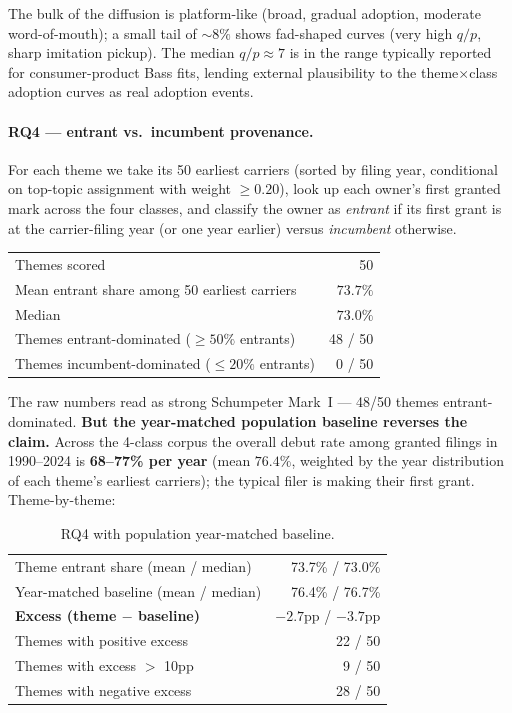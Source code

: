 \documentclass[11pt]{article}
\begin{document}
\noindent The bulk of the diffusion is platform-like (broad, gradual adoption,
moderate word-of-mouth); a small tail of $\sim 8\%$ shows fad-shaped curves
(very high $q/p$, sharp imitation pickup). The median $q/p \approx 7$ is in
the range typically reported for consumer-product Bass fits, lending external
plausibility to the theme$\times$class adoption curves as real adoption events.

\paragraph{RQ4 --- entrant vs.\ incumbent provenance.} For each theme we take
its 50 earliest carriers (sorted by filing year, conditional on top-topic
assignment with weight $\geq 0.20$), look up each owner's first granted mark
across the four classes, and classify the owner as \emph{entrant} if its first
grant is at the carrier-filing year (or one year earlier) versus
\emph{incumbent} otherwise.

\begin{table}[h]\centering\small
\begin{tabular}{lr}
\toprule
Themes scored                                    & 50 \\
Mean entrant share among 50 earliest carriers   & $73.7\%$ \\
Median                                            & $73.0\%$ \\
Themes entrant-dominated ($\geq 50\%$ entrants) & 48 / 50 \\
Themes incumbent-dominated ($\leq 20\%$ entrants) & 0 / 50 \\
\bottomrule
\end{tabular}
\end{table}

\noindent The raw numbers read as strong Schumpeter Mark~I --- 48/50 themes
entrant-dominated. \textbf{But the year-matched population baseline reverses
the claim.} Across the 4-class corpus the overall debut rate among granted
filings in 1990--2024 is \textbf{68--77\% per year} (mean $76.4\%$, weighted by
the year distribution of each theme's earliest carriers); the typical filer is
making their first grant. Theme-by-theme:

\begin{table}[h]\centering\small
\caption{RQ4 with population year-matched baseline.}
\begin{tabular}{lr}
\toprule
Theme entrant share (mean / median)              & 73.7\% / 73.0\% \\
Year-matched baseline (mean / median)            & 76.4\% / 76.7\% \\
\textbf{Excess (theme $-$ baseline)} & $\mathbf{-2.7}$pp / $-3.7$pp \\
Themes with positive excess                       & 22 / 50 \\
Themes with excess $>$ 10pp                       & 9 / 50 \\
Themes with negative excess                       & 28 / 50 \\
\bottomrule
\end{tabular}
\end{table}
\end{document}
